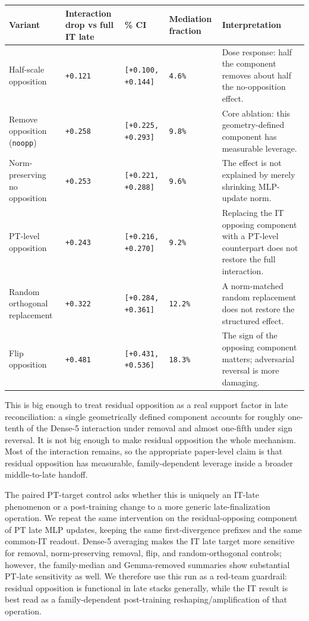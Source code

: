 \documentclass[11pt]{article}
\begin{document}
\begin{table}[t]
\centering
\small
\setlength{\tabcolsep}{3pt}
\begin{tabularx}{\linewidth}{@{}>{\raggedright\arraybackslash}X >{\raggedright\arraybackslash}X >{\raggedright\arraybackslash}X >{\raggedright\arraybackslash}X >{\raggedright\arraybackslash}X@{}}
\toprule
Variant & Interaction drop vs full IT late & 95\% CI & Mediation fraction & Interpretation \\
\midrule
Half-scale opposition & \texttt{+0.121} & \texttt{[+0.100, +0.144]} & \texttt{4.6\%} & Dose response: half the component removes about half the no-opposition effect. \\
Remove opposition (\texttt{noopp}) & \texttt{+0.258} & \texttt{[+0.225, +0.293]} & \texttt{9.8\%} & Core ablation: this geometry-defined component has measurable leverage. \\
Norm-preserving no opposition & \texttt{+0.253} & \texttt{[+0.221, +0.288]} & \texttt{9.6\%} & The effect is not explained by merely shrinking MLP-update norm. \\
PT-level opposition & \texttt{+0.243} & \texttt{[+0.216, +0.270]} & \texttt{9.2\%} & Replacing the IT opposing component with a PT-level counterpart does not restore the full interaction. \\
Random orthogonal replacement & \texttt{+0.322} & \texttt{[+0.284, +0.361]} & \texttt{12.2\%} & A norm-matched random replacement does not restore the structured effect. \\
Flip opposition & \texttt{+0.481} & \texttt{[+0.431, +0.536]} & \texttt{18.3\%} & The sign of the opposing component matters; adversarial reversal is more damaging. \\
\bottomrule
\end{tabularx}
\end{table}

This is big enough to treat residual opposition as a real support factor in late reconciliation: a single geometrically defined component accounts for roughly one-tenth of the Dense-5 interaction under removal and almost one-fifth under sign reversal. It is not big enough to make residual opposition the whole mechanism. Most of the interaction remains, so the appropriate paper-level claim is that residual opposition has measurable, family-dependent leverage inside a broader middle-to-late handoff.

The paired PT-target control asks whether this is uniquely an IT-late phenomenon or a post-training change to a more generic late-finalization operation. We repeat the same intervention on the residual-opposing component of PT late MLP updates, keeping the same first-divergence prefixes and the same common-IT readout. Dense-5 averaging makes the IT late target more sensitive for removal, norm-preserving removal, flip, and random-orthogonal controls; however, the family-median and Gemma-removed summaries show substantial PT-late sensitivity as well. We therefore use this run as a red-team guardrail: residual opposition is functional in late stacks generally, while the IT result is best read as a family-dependent post-training reshaping/amplification of that operation.
\end{document}
